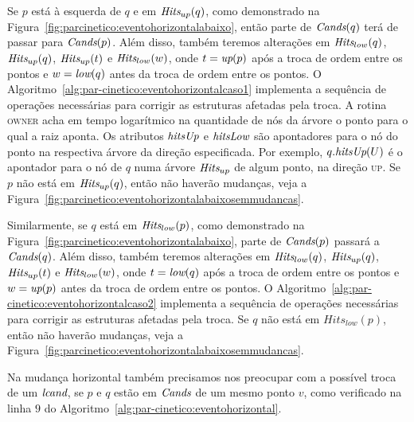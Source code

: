 

Se $p$ está à esquerda de $q$ e em $\textit{Hits}_{up}(q)$, como demonstrado na
Figura~\ref{fig:parcinetico:eventohorizontalabaixo}, então parte de $\textit{Cands}(q)$ terá de passar
para $\textit{Cands}(p)$.
Além disso, também teremos alterações em $\textit{Hits}_{low}(q)$, $\textit{Hits}_{up}(q)$, $\textit{Hits}_{up}(t)$ e
$\textit{Hits}_{low}(w)$, onde $t = \textit{up}(p)$ após a troca de ordem entre os pontos e $w = \textit{low}(q)$ antes da
troca de ordem entre os pontos.
O Algoritmo~\ref{alg:par-cinetico:eventohorizontalcaso1} implementa a sequência de operações
necessárias para corrigir as estruturas afetadas pela troca.
A rotina \textsc{owner} acha em tempo logarítmico na quantidade de nós da árvore o ponto para o
qual a raiz aponta.
Os atributos $\textit{hitsUp}$ e $\textit{hitsLow}$ são apontadores para o nó do ponto na respectiva árvore da
direção especificada.
Por exemplo, $q.\textit{hitsUp}(U)$ é o apontador para o nó de $q$ numa árvore $\textit{Hits}_{up}$ de algum
ponto, na direção \textsc{up}.
Se $p$ não está em $\textit{Hits}_{up}(q)$, então não haverão mudanças, veja a
Figura~\ref{fig:parcinetico:eventohorizontalabaixosemmudancas}.

Similarmente, se $q$ está em $\textit{Hits}_{low}(p)$, como demonstrado na
Figura~\ref{fig:parcinetico:eventohorizontalabaixo}, parte de $\textit{Cands}(p)$ passará a $\textit{Cands}(q)$.
Além disso, também teremos alterações em $\textit{Hits}_{low}(q)$, $\textit{Hits}_{up}(q)$, $\textit{Hits}_{up}(t)$ e
$\textit{Hits}_{low}(w)$, onde $t = \textit{low}(q)$ após a troca de ordem entre os pontos e $w = \textit{up}(p)$ antes da
troca de ordem entre os pontos.
O Algoritmo~\ref{alg:par-cinetico:eventohorizontalcaso2} implementa a sequência de operações
necessárias para corrigir as estruturas afetadas pela troca.
Se $q$ não está em $Hits_{low}(p)$, então não haverão mudanças, veja a
Figura~\ref{fig:parcinetico:eventohorizontalabaixosemmudancas}.







Na mudança horizontal também precisamos nos preocupar com a possível troca de um
$\textit{lcand}$, se $p$ e $q$ estão em $\textit{Cands}$ de um mesmo ponto $v$, como verificado na linha $9$ do
Algoritmo~\ref{alg:par-cinetico:eventohorizontal}.



